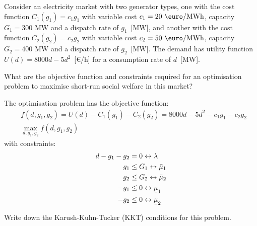 \documentclass[11pt,a4paper,fleqn]{scrartcl}
\def\l{\lambda}
\def\m{\mu}
\def\mw{\text{ MW}}
\def\emwh{\text{ \euro/MWh}}
\newcommand{\ubar}[1]{\text{\b{$#1$}}}
\begin{document}
Consider an electricity market with two generator types, one with the cost function $C_1(g_1)=c_1g_1$ with variable cost $c_1 = 20\emwh$, capacity $G_1 = 300\mw$ and a dispatch rate of $g_1$~[MW], and another with the cost function $C_2(g_2)=c_2g_2$ with variable cost $c_2=50\emwh$, capacity $G_2=400\mw$ and a dispatch rate of $g_2$~[MW]. The demand has utility function $U(d) = 8000d - 5d^2$~[\euro/h] for a consumption rate of $d$~[MW].
\begin{enumerate}[(a)]
 \begin{shaded}\item What are the objective function and constraints required for an optimisation problem to maximise short-run social welfare in this market?\end{shaded}

 The optimisation problem has the objective function:
 \begin{align*}
 &f(d, g_1, g_2) =  U(d) - C_1(g_1) - C_2(g_2) = 8000d-5d^2 - c_1g_1 - c_2g_2 \\
 & \max_{d,g_1,g_2}f(d, g_1, g_2)
 \end{align*}
 with constraints:
 \begin{align*}
  d - g_1 - g_2 & = 0 \leftrightarrow \l              \\
  g_1           & \leq G_1 \leftrightarrow \bar{\m}_1 \\
  g_2           & \leq G_2 \leftrightarrow \bar{\m}_2 \\
  -g_1          & \leq 0 \leftrightarrow \ubar{\m}_1  \\
  -g_2          & \leq 0 \leftrightarrow \ubar{\m}_2
 \end{align*}
 \begin{shaded}\item Write down the Karush-Kuhn-Tucker (KKT) conditions for this problem.\end{shaded}


\end{enumerate}
\end{document}
